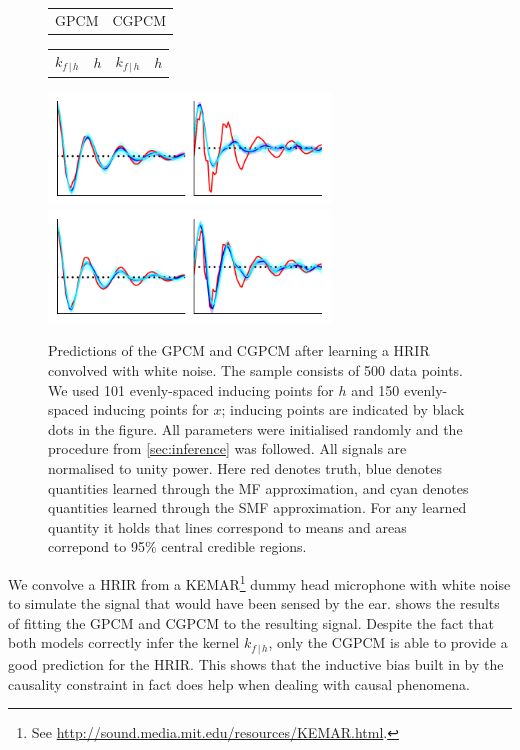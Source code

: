 \documentclass{article}
\newcommand{\cond}{\, | \,}               %
\begin{document}
\begin{figure}[t]
    \centering
    \begin{tabularx}{\linewidth}{>{\centering}X>{\centering}X}
        GPCM & CGPCM
    \end{tabularx}
    \begin{tabularx}{\linewidth}{>{\centering}X>{\centering}X>{\centering}X>{\centering}X}
        $k_{f\cond h}$ & $h$ & $k_{f\cond h}$ & $h$
    \end{tabularx}
    \includegraphics[width=.49\linewidth, height=3cm]{resources/hrtf_gpcm.pdf}
    \includegraphics[width=.49\linewidth, height=3cm]{resources/hrtf_cgpcm.pdf}
    \caption{Predictions of the GPCM and CGPCM after learning a HRIR convolved with white noise. The sample consists of 500 data points. We used 101 evenly-spaced inducing points for $h$ and 150 evenly-spaced inducing points for $x$; inducing points are indicated by black dots in the figure. All parameters were initialised randomly and the procedure from \cref{sec:inference} was followed. All signals are normalised to unity power. Here {\color{red}red} denotes truth, {\color{blue}blue} denotes quantities learned through the MF approximation, and {\color{mycyan}cyan} denotes quantities learned through the SMF approximation. For any learned quantity it holds that lines correspond to means and areas correpond to 95\% central credible regions.}
    \label{fig:hrir}
\end{figure}

We convolve a HRIR from a KEMAR\footnote{See \url{http://sound.media.mit.edu/resources/KEMAR.html}.} dummy head microphone with white noise to simulate the signal that would have been sensed by the ear.  shows the results of fitting the GPCM and CGPCM to the resulting signal. Despite the fact that both models correctly infer the kernel $k_{f \cond h}$, only the CGPCM is able to provide a good prediction for the HRIR. This shows that the inductive bias built in by the causality constraint in fact does help when dealing with causal phenomena.
\end{document}
